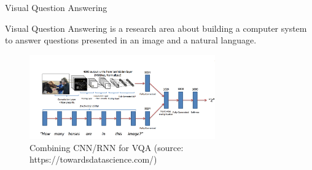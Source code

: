 \begin{vbframe}{Visual Question Answering}

Visual Question Answering is a research area about building a computer system to answer questions presented in an image and a natural language.

    \begin{figure}
        \centering
        \includegraphics[width=8cm]{figure/VQA.png}
        \caption{Combining CNN/RNN for VQA (source: https://towardsdatascience.com/)}
    \end{figure}


\end{vbframe}




\endlecture

